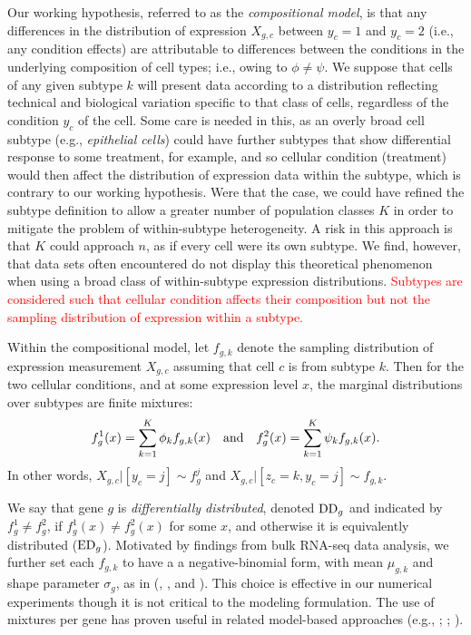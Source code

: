 \documentclass[aoas,preprint]{imsart}
\begin{document}
Our working hypothesis, referred to as the {\em compositional model},  is that any differences in the distribution of expression $X_{g,c}$ 
between $y_c=1$ and $y_c=2$ (i.e., any condition effects) are attributable 
to differences between the conditions 
in the underlying composition of cell types; i.e.,
owing to $\phi \neq \psi$.  We suppose that cells of any given subtype $k$ will
present data according to a distribution reflecting technical 
and biological variation specific to that class of cells, regardless of the 
condition $y_c$ of the cell.   Some care is needed in this, as an overly
broad cell subtype (e.g., {\em epithelial cells}) could have
further subtypes that show differential response to some treatment, for example,
and so cellular condition (treatment) would then affect the distribution of 
expression data within the subtype, which is contrary to our working hypothesis.
Were that the case,  we could have refined the subtype definition to allow a greater
number of population classes $K$ in order to mitigate the problem of within-subtype 
heterogeneity. A  risk in this approach is that $K$ could approach $n$, as if  
every cell were  its own subtype.  We find, however,
that data sets often encountered do not display this theoretical phenomenon
when using a broad class of within-subtype expression distributions. \textcolor{red}{Subtypes are
considered such 
that cellular condition affects their composition but not the sampling distribution of expression
within a subtype.}

Within the compositional model, let $f_{g,k}$ denote the sampling distribution
of expression measurement $X_{g,c}$ assuming that cell $c$ is from subtype $k$.
Then for the two cellular conditions, and at some expression level $x$, 
the marginal distributions over subtypes are finite mixtures:
\begin{eqnarray*}
f_g^1(x) = \sum_{k=1}^K \phi_k f_{g,k} (x) \quad {\mbox {\rm and}} \quad
f_g^2(x) = \sum_{k=1}^K \psi_k f_{g,k} (x).
\end{eqnarray*}
In other words,  $X_{g,c} |[ y_c=j]  \sim f_g^j$  and $X_{g,c} |[ z_c=k, y_c=j] \sim f_{g,k}$.

We say that gene $g$ is {\em differentially distributed}, denoted ${\rm DD}_g$ and indicated
by $f_g^1 \neq f_g^2$,
if $f_g^1(x) \neq f_g^2(x)$ for some $x$, and otherwise it is equivalently distributed
(${\rm ED}_g$). Motivated by findings from bulk RNA-seq data analysis, we further
set each $f_{g,k}$ to have a a negative-binomial form, with mean $\mu_{g,k}$
and shape parameter $\sigma_g$, as in  (\cite{ref:Leng}, \cite{DES}, \cite{ref:Des} and \cite{Chen:2018aa}). 
This choice is effective in our numerical experiments though it is 
not critical to the modeling formulation.  The use of mixtures per gene has proven
useful in related model-based approaches (e.g., 
\cite{ref:MAST}; \cite{McDavid:2014aa}; \cite{Huang:2018aa}).
\end{document}
